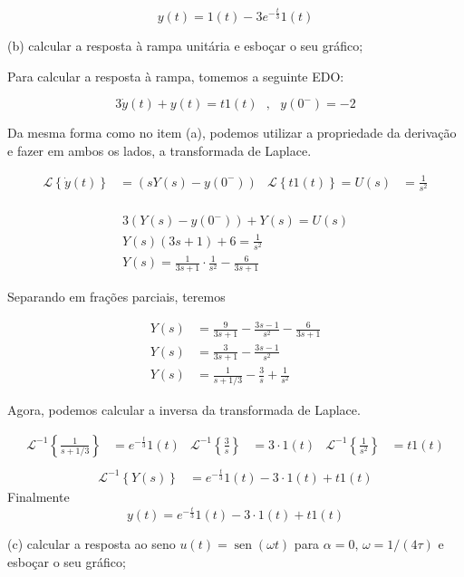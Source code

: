 \documentclass{article}
\DeclareMathOperator{\sen}{sen}
\begin{document}
\[y(t) = 1(t) - 3e^{-\frac{t}{3}}1(t)\]


(b) calcular a resposta à rampa unitária e esboçar o seu gráfico;

Para calcular a resposta à rampa, tomemos a seguinte EDO:

\[3\dot{y}(t) + y(t) = t1(t) \,\,\,\,,\,\,\,\,y(0^-) = -2\]

Da mesma forma como no item (a), podemos utilizar a propriedade da derivação e fazer em ambos os lados, a transformada de Laplace.

\begin{align*}
    \mathcal{L}\left\{\dot{y}(t)\right\} &= \left(sY(s) - y(0^-)\right) & \mathcal{L}\left\{t1(t)\right\} = U(s) &= \frac{1}{s^2}\\
\end{align*}

\begin{align*}
    3(Y(s) - y(0^-)) + Y(s) = U(s)\\
    Y(s)(3s + 1) + 6 = \frac{1}{s^2}\\
    Y(s) = \frac{1}{3s + 1}\cdot\frac{1}{s^2} - \frac{6}{3s + 1}
\end{align*}

Separando em frações parciais, teremos

\begin{align*}
    Y(s) &= \frac{9}{3s + 1} - \frac{3s - 1}{s^2} - \frac{6}{3s + 1}\\
    Y(s) &= \frac{3}{3s + 1} - \frac{3s - 1}{s^2}\\
    Y(s) &= \frac{1}{s + 1/3} - \frac{3}{s} + \frac{1}{s^2}
\end{align*}

Agora, podemos calcular a inversa da transformada de Laplace.

\begin{align*}
    \mathcal{L}^{-1} \left\{\frac{1}{s + 1/3}\right\} &= e^{-\frac{t}{3}}1(t) & \mathcal{L}^{-1} \left\{\frac{3}{s}\right\} &= 3\cdot1(t) & \mathcal{L}^{-1} \left\{\frac{1}{s^2}\right\} &= t1(t)\\
\end{align*}
\begin{align*}
    \mathcal{L}^{-1} \left\{Y(s)\right\} &= e^{-\frac{t}{3}}1(t) - 3\cdot1(t) + t1(t)
\end{align*}
Finalmente
\[y(t) = e^{-\frac{t}{3}}1(t) - 3\cdot1(t) + t1(t)\]

(c) calcular a resposta ao seno $u(t) = \sen(\omega t)$ para $\alpha = 0,\, \omega = 1/(4\tau)$ e esboçar o seu gráfico;
\end{document}
